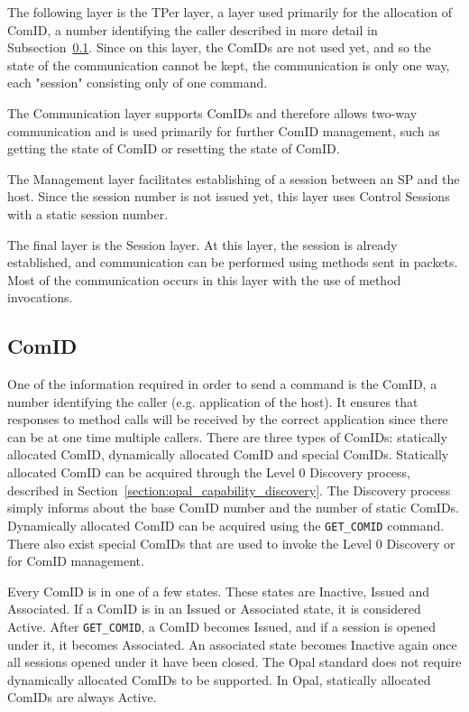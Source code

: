 The following layer is the TPer layer, a layer used primarily for the allocation of ComID, a number identifying the caller described in more detail in Subsection~\ref{subsection:comid}. Since on this layer, the ComIDs are not used yet, and so the state of the communication cannot be kept, the communication is only one way, each "session" consisting only of one command.

The Communication layer supports ComIDs and therefore allows two-way communication and is used primarily for further ComID management, such as getting the state of ComID or resetting the state of ComID.

The Management layer facilitates establishing of a session between an SP and the host. Since the session number is not issued yet, this layer uses Control Sessions with a static session number.

The final layer is the Session layer. At this layer, the session is already established, and communication can be performed using methods sent in packets. Most of the communication occurs in this layer with the use of method invocations.

\subsection{ComID}
\label{subsection:comid}

One of the information required in order to send a command is the ComID, a number identifying the caller (e.g. application of the host). It ensures that responses to method calls will be received by the correct application since there can be at one time multiple callers. 
There are three types of ComIDs: statically allocated ComID, dynamically allocated ComID and special ComIDs.
Statically allocated ComID can be acquired through the Level 0 Discovery process, described in Section~\ref{section:opal_capability_discovery}. The Discovery process simply informs about the base ComID number and the number of static ComIDs.
Dynamically allocated ComID can be acquired using the \verb|GET_COMID| command.
There also exist special ComIDs that are used to invoke the Level 0 Discovery or for ComID management.

Every ComID is in one of a few states. These states are Inactive, Issued and Associated. If a ComID is in an Issued or Associated state, it is considered Active. After \verb|GET_COMID|, a ComID becomes Issued, and if a session is opened under it, it becomes Associated. An associated state becomes Inactive again once all sessions opened under it have been closed.
The Opal standard does not require dynamically allocated ComIDs to be supported.
In Opal, statically allocated ComIDs are always Active.

